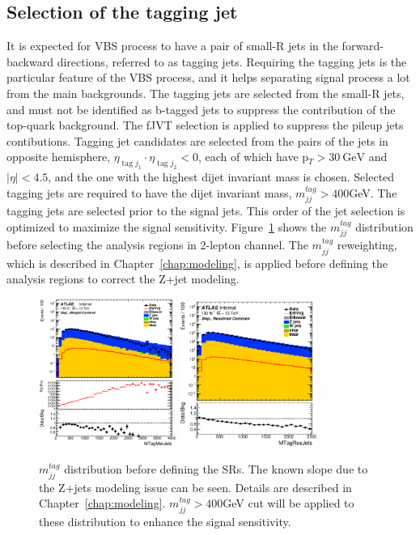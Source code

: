 \subsection{Selection of the tagging jet}
It is expected for VBS process to have a pair of small-R jets in the forward-backward directions, referred to as tagging jets.
Requiring the tagging jets is the particular feature of the VBS process, and it helps separating signal process a lot from the main backgrounds.
The tagging jets are selected from the small-R jets, and must not be identified as b-tagged jets to suppress the contribution of the top-quark background. 
The fJVT selection is applied to suppress the pileup jets contibutions. Tagging jet candidates are selected from the pairs of the jets in opposite hemisphere, $\eta_{\operatorname{tag} j_{1}} \cdot \eta_{\operatorname{tag} j_{2}}<0$, each of which have p$_T > 30~\mathrm{GeV}$ and $|\eta| < 4.5$, and the one with the highest dijet invariant mass is chosen.  
Selected tagging jets are required to have the dijet invariant mass, $m^{tag}_{jj} > 400$GeV.
The tagging jets are selected prior to the signal jets. This order of the jet selection is optimized to maximize the signal sensitivity.
Figure~\ref{fig:Mtagjj} shows the $m^{tag}_{jj}$ distribution before selecting the analysis regions in 2-lepton channel.
The $m^{tag}_{jj}$ reweighting, which is described in Chapter~\ref{chap:modeling}, is applied before defining the analysis regions to correct the Z+jet modeling.
\begin{figure}[ht]
    \centering
    \includegraphics[width=0.4\textwidth]{figures/2lep/dataMC/C_0ptag1pfat0pjet_0ptv_MergedCommon_MTagMerJets_Log}
    \includegraphics[width=0.4\textwidth]{figures/2lep/dataMC/C_0ptag2pjet_0ptv_ResolvedCommon_MTagResJets_Log} 
    \caption{$m^{tag}_{jj}$ distribution before defining the SRs. The known slope due to the Z+jets modeling issue can be seen. Details are described in Chapter~\ref{chap:modeling}. $m^{tag}_{jj} > 400$GeV cut will be applied to these distribution to enhance the signal sensitivity.}
    \label{fig:Mtagjj}
\end{figure}

